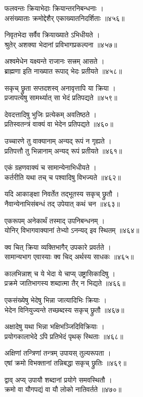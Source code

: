 फलवन्तः क्रियाभेदाः क्रियान्तरनिबन्धनाः ।\\असंख्याताः क्रमोद्देशैर् एकाख्यातनिदर्शिताः ॥४५६॥

निवृतभेदा सर्वैव क्रियाख्याते ऽभिधीयते ।\\श्रुतेर् अशक्या भेदानां प्रविभागप्रकल्पना ॥४५७॥

अश्वमेधेन यक्ष्यन्ते राजानः सत्त्रम् आसते ।\\ब्राह्मणा इति नाख्यात रूपाद् भेदः प्रतीयते ॥४५८॥

सकृच् छ्रुता सप्तदशस्व् अनावृत्तापि या क्रिया ।\\प्रजापत्येषु सामर्थ्यात् सा भेदं प्रतिपद्यते ॥४५९॥

देवदत्तादिषु भुजिः प्रत्येकम् अवतिष्ठते ।\\प्रतिस्वतन्त्रं वाक्यं वा भेदेन प्रतिपद्यते ॥४६०॥

उच्चारणे तु वाक्यानाम् अन्यद् रूपं न गृह्यते ।\\प्रतिपत्तौ तु भिन्नानाम् अन्यद् रूपं प्रतीयते ॥४६१॥

एकं ग्रहणवाक्यं च सामान्येनाभिधीयते ।\\कर्तरीति यथा तच् च पश्वादिषु विभज्यते ॥४६२॥

यदि आकाङ्क्षा निवर्तेत तद्भूतस्य सकृच् छ्रुतौ ।\\नैवान्येनाभिसंबन्धं तद् उपेयात् कथं चन ॥४६३॥

एकरूपम् अनेकार्थं तस्माद् उपनिबन्धनम् ।\\योनिर् विभागवाक्यानां तेभ्यो ऽनन्यद् इव स्थितम् ॥४६४॥

क्व चित् क्रिया व्यक्तिभागैर् उपकारे प्रवर्तते ।\\सामान्यभाग एवास्याः क्व चिद् अर्थस्य साधकः ॥४६५॥

कालभिन्नाश् च ये भेदा ये चाप्य् उष्ट्रासिकादिषु ।\\प्रक्रमे जातिभागस्य शब्दात्मा तैर् न भिद्यते ॥४६६॥

एकसंख्येषु भेदेषु भिन्ना जात्यादिभिः क्रियाः ।\\भेदेन विनियुज्यन्ते तच्छब्दस्य सकृच् छ्रुतौ ॥४६७॥

अक्षादेषु यथा भिन्ना भक्षिभञ्जिदिविक्रियाः ।\\प्रयोगकालाभेदे ऽपि प्रतिभेदं पृथक् स्थिताः ॥४६८॥

अक्षिणां तन्त्रिणां तन्त्रम् उपायस् तुल्यरूपता ।\\एषां क्रमो विभक्तानां तन्निबद्धा सकृच् छ्रुतिः ॥४६९॥

द्वाव् अप्य् उपायौ शब्दानां प्रयोगे समवस्थितौ ।\\क्रमो वा यौगपद्यं वा यौ लोको नातिवर्तते ॥४७०॥

